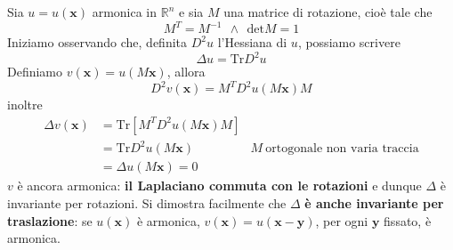 \documentclass[10pt,a4paper,twoside,openright]{book}
\newcommand{\x}{\mathbf{x}}
\newcommand{\y}{\mathbf{y}}
\begin{document}
Sia $\displaystyle u=u(\x)$ armonica in $\displaystyle \mathbb{R}^{n}$ e sia $M$ una matrice di rotazione, cioè tale che
\begin{equation*}
	M^{T} =M^{-1} \ \ \land \ \ \mathrm{det} M=1
\end{equation*}
Iniziamo osservando che, definita $\displaystyle D^{2} u$ l'Hessiana di $u$, possiamo scrivere
\begin{equation*}
	\Delta u=\mathrm{Tr} D^{2} u
\end{equation*}
Definiamo $v(\x) =u(M\x)$, allora
\begin{equation*}
	D^{2} v(\x) =M^{T} D^{2} u(M\x) M
\end{equation*}
inoltre
\begin{align*}
	\Delta v(\x) & =\mathrm{Tr}\left[ M^{T} D^{2} u(M\x) M\right] &                                        \\
	             & =\mathrm{Tr} D^{2} u(M\x)                      & M\ \text{ortogonale non varia traccia} \\
	             & =\Delta u(M\x) =0                              &                                        
\end{align*}
$v$ è ancora armonica: \textbf{il Laplaciano commuta con le rotazioni} e dunque $\Delta $ è invariante per rotazioni. Si dimostra facilmente che $\Delta $ \textbf{è anche invariante per traslazione}: se $u(\x)$ è armonica, $v(\x) =u(\x-\y)$, per ogni $\y$ fissato, è armonica.
\end{document}

